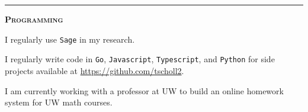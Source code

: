\documentclass[12pt]{article}
\newcommand{\sectionheading}[1]
{
\bigskip %
\noindent
\hspace{-6.5mm}\textcolor{Gray}{\rule[.75mm]{21.5mm}{1mm}} %
\hspace{.2mm}	%
{\large{\textbf{\textsc{#1}}}} %
}
\begin{document}
	\sectionheading{Programming}%
	
        \vspace{1ex}
        
        \noindent I regularly use {\tt Sage} in my research.
       

		\noindent I regularly write code in {\tt Go}, {\tt Javascript}, {\tt Typescript}, and {\tt Python} for side projects available at \url{https://github.com/tscholl2}.

		\noindent I am currently working with a professor at UW to build an online homework system for UW math courses.

\end{document}
